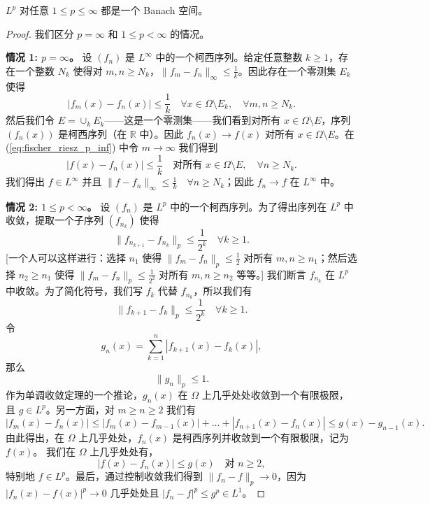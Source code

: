 \begin{theorem}\label{theorem4.8}
$L^p$ 对任意 $1 \le p \le \infty$ 都是一个 Banach 空间。
\end{theorem}
\begin{proof}
我们区分 $p=\infty$ 和 $1 \le p < \infty$ 的情况。

\textbf{情况 1: $p=\infty$。} 设 $(f_n)$ 是 $L^\infty$ 中的一个柯西序列。给定任意整数 $k \ge 1$，存在一个整数 $N_k$ 使得对 $m, n \ge N_k$，$\|f_m - f_n\|_\infty \le \frac{1}{k}$。因此存在一个零测集 $E_k$ 使得
\begin{equation}\label{eq:fischer_riesz_p_inf}
|f_m(x) - f_n(x)| \le \frac{1}{k} \quad \forall x \in \Omega \setminus E_k, \quad \forall m, n \ge N_k.
\end{equation}
然后我们令 $E = \cup_k E_k$——这是一个零测集——我们看到对所有 $x \in \Omega \setminus E$，序列 $(f_n(x))$ 是柯西序列（在 $\mathbb{R}$ 中）。因此 $f_n(x) \to f(x)$ 对所有 $x \in \Omega \setminus E$。在 (\ref{eq:fischer_riesz_p_inf}) 中令 $m \to \infty$ 我们得到
\[ |f(x) - f_n(x)| \le \frac{1}{k} \quad \text{对所有 } x \in \Omega \setminus E, \quad \forall n \ge N_k. \]
我们得出 $f \in L^\infty$ 并且 $\|f - f_n\|_\infty \le \frac{1}{k} \quad \forall n \ge N_k$；因此 $f_n \to f$ 在 $L^\infty$ 中。

\textbf{情况 2: $1 \le p < \infty$。} 设 $(f_n)$ 是 $L^p$ 中的一个柯西序列。为了得出序列在 $L^p$ 中收敛，提取一个子序列 $(f_{n_k})$ 使得
\[ \|f_{n_{k+1}} - f_{n_k}\|_p \le \frac{1}{2^k} \quad \forall k \ge 1. \]
[一个人可以这样进行：选择 $n_1$ 使得 $\|f_m - f_n\|_p \le \frac{1}{2}$ 对所有 $m, n \ge n_1$；然后选择 $n_2 \ge n_1$ 使得 $\|f_m - f_n\|_p \le \frac{1}{2^2}$ 对所有 $m, n \ge n_2$ 等等。] 我们断言 $f_{n_k}$ 在 $L^p$ 中收敛。为了简化符号，我们写 $f_k$ 代替 $f_{n_k}$，所以我们有
\begin{equation}\label{eq:fischer_riesz_p_finite}
\|f_{k+1} - f_k\|_p \le \frac{1}{2^k} \quad \forall k \ge 1.
\end{equation}
令
\[ g_n(x) = \sum_{k=1}^n |f_{k+1}(x) - f_k(x)|, \]
那么
\[ \|g_n\|_p \le 1. \]
作为单调收敛定理的一个推论，$g_n(x)$ 在 $\Omega$ 上几乎处处收敛到一个有限极限，且 $g \in L^p$。另一方面，对 $m \ge n \ge 2$ 我们有
\[ |f_m(x) - f_n(x)| \le |f_m(x) - f_{m-1}(x)| + \dots + |f_{n+1}(x) - f_n(x)| \le g(x) - g_{n-1}(x). \]
由此得出，在 $\Omega$ 上几乎处处，$f_n(x)$ 是柯西序列并收敛到一个有限极限，记为 $f(x)$。
我们在 $\Omega$ 上几乎处处有，
\begin{equation}\label{eq:fischer_riesz_p_finite_2}
|f(x) - f_n(x)| \le g(x) \quad \text{对 } n \ge 2,
\end{equation}
特别地 $f \in L^p$。最后，通过控制收敛我们得到 $\|f_n - f\|_p \to 0$，因为 $|f_n(x) - f(x)|^p \to 0$ 几乎处处且 $|f_n - f|^p \le g^p \in L^1$。
\end{proof}

